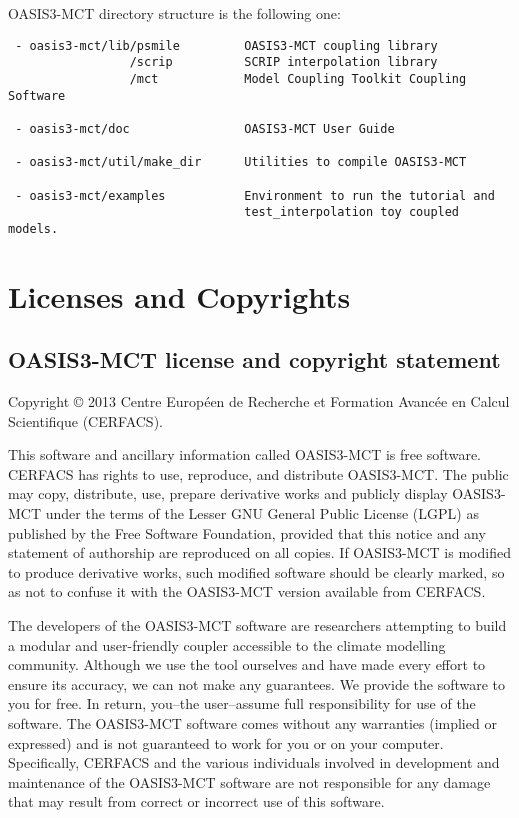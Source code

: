 OASIS3-MCT directory structure is the following one:

\begin{verbatim}
 - oasis3-mct/lib/psmile         OASIS3-MCT coupling library
                 /scrip          SCRIP interpolation library
                 /mct            Model Coupling Toolkit Coupling Software
                  
 - oasis3-mct/doc                OASIS3-MCT User Guide

 - oasis3-mct/util/make_dir      Utilities to compile OASIS3-MCT

 - oasis3-mct/examples           Environment to run the tutorial and
                                 test_interpolation toy coupled models. 
\end{verbatim}
\newpage
\section{Licenses and Copyrights}
 
\subsection{OASIS3-MCT license and copyright statement}

Copyright © 2013 Centre Europ\'een de Recherche et Formation
Avanc\'ee en Calcul Scientifique (CERFACS).  

This software and ancillary information called OASIS3-MCT is free
software.  CERFACS has rights to use, reproduce, and distribute
OASIS3-MCT. The public may copy, distribute, use, prepare derivative works and
publicly display OASIS3-MCT under the terms of the Lesser GNU General
Public License (LGPL) as published by the Free Software Foundation,
provided that this notice and any statement of authorship are
reproduced on all copies. If OASIS3-MCT is modified to produce derivative
works, such modified software should be clearly marked, so as not to
confuse it with the OASIS3-MCT version available from CERFACS.

The developers of the OASIS3-MCT software are researchers attempting to
build a modular and user-friendly coupler accessible to the climate
modelling community. Although we use the tool ourselves and have made
every effort to ensure its accuracy, we can not make any
guarantees. We provide the software to you for free. In return,
you--the user--assume full responsibility for use of the software. The
OASIS3-MCT software comes without any warranties (implied or expressed) and
is not guaranteed to work for you or on your computer. Specifically,
CERFACS and the various individuals involved in development and
maintenance of the OASIS3-MCT software are not responsible for any damage
that may result from correct or incorrect use of this software.

